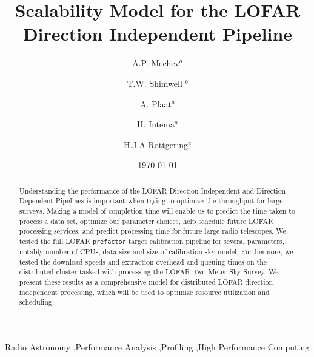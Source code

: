 \documentclass[preprint,5p]{elsarticle}
\begin{document}
\sloppy

\begin{frontmatter}


\title{Scalability Model for the LOFAR Direction Independent Pipeline}%
\author{A.P. Mechev$^a$}

\author{T.W. Shimwell $^b$}%
\author{A. Plaat$^a$}%
\author{H. Intema$^a$}%
\author{H.J.A Rottgering$^a$}%

\date{\today}%
\address{$^a$ Leiden University}
\address{$^b$ ASTRON }
\address{$^c$ Affiliation Address 3}

\begin{abstract}
Understanding the performance of the LOFAR Direction Independent and Direction Dependent Pipelines is important when trying to optimize the throughput for large surveys. Making a model of completion time will enable us to predict the time taken to process a data set, optimize our parameter choices, help schedule future LOFAR processing services, and predict processing time for future large radio telescopes. We tested the full LOFAR \texttt{prefactor} target calibration pipeline for several parameters, notably number of CPUs, data size and size of calibration sky model. Furthermore, we tested the download speeds and extraction overhead and queuing times on the distributed cluster tasked with processing the LOFAR Two-Meter Sky Survey. We present these results as a comprehensive model for distributed LOFAR direction independent processing, which will be used to optimize resource utilization and scheduling. 

\end{abstract}
\begin{keyword}
Radio Astronomy \sep Performance Analysis \sep Profiling \sep High Performance Computing


\end{keyword}
\end{frontmatter}
\end{document}
